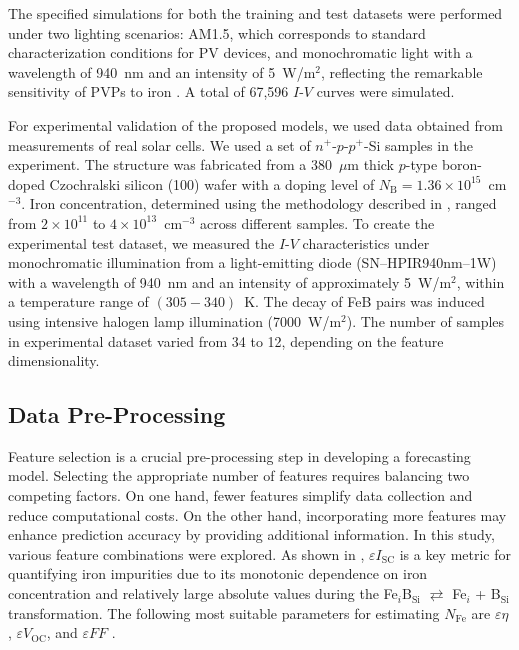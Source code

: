 \documentclass[a4paper,fleqn]{cas-sc}
\begin{document}
The specified simulations for both the training and test datasets were performed under two lighting scenarios:
AM1.5, which corresponds to standard characterization conditions for PV devices,
and monochromatic light with a wavelength of 940~nm and an intensity of 5~W/m$^{2}$,
reflecting the remarkable sensitivity of PVPs to iron \cite{Olikh2025MSEB}.
A total of 67,596 $I$-$V$ curves were simulated.

For experimental validation of the proposed models, we used data obtained from measurements of real solar cells.
We used a set of $n^+$-$p$-$p^+$-Si samples in the experiment.
The structure was fabricated from a 380~$\mu$m thick $p$-type boron-doped Czochralski silicon (100) wafer
with a doping level of $N_\mathrm{B}=1.36\times10^{15}$~cm$^{-3}$.
Iron concentration, determined using the methodology described in \cite{Olikh2022:JMatSci, Olikh2021JAP},
ranged from $2\times10^{11}$ to $4\times10^{13}$~cm$^{-3}$ across different samples.
To create the experimental test dataset,
we measured the $I$-$V$ characteristics under monochromatic illumination from a light-emitting diode (SN–HPIR940nm–1W)
with a wavelength of 940~nm and an intensity of approximately 5~W/m$^{2}$, within a temperature range of $(305-340)$~K.
The decay of FeB pairs was induced using intensive halogen lamp illumination (7000~W/m$^{2}$).
The number of samples in experimental dataset varied from 34 to 12, depending on the feature dimensionality.


\subsection{Data Pre-Processing}

Feature selection is a crucial pre-processing step in developing a forecasting model.
Selecting the appropriate number of features requires balancing two competing factors.
On one hand, fewer features simplify data collection and reduce computational costs.
On the other hand, incorporating more features may enhance prediction accuracy by providing additional information.
In this study, various feature combinations were explored.
As shown in \cite{Olikh2025MSEB}, $\varepsilon I_\mathrm{SC}$ is a key metric for quantifying iron impurities
due to its monotonic dependence on iron concentration and relatively large absolute values during the
Fe$_i$B$_\mathrm{Si}$ $\rightleftarrows$ Fe$_i$ + B$_\mathrm{Si}$
transformation.
The following most suitable parameters for estimating $N_\mathrm{Fe}$ are
$\varepsilon \eta$, $\varepsilon V_\mathrm{OC}$, and $\varepsilon F\!F$ \cite{Olikh2025MSEB}.
\end{document}
